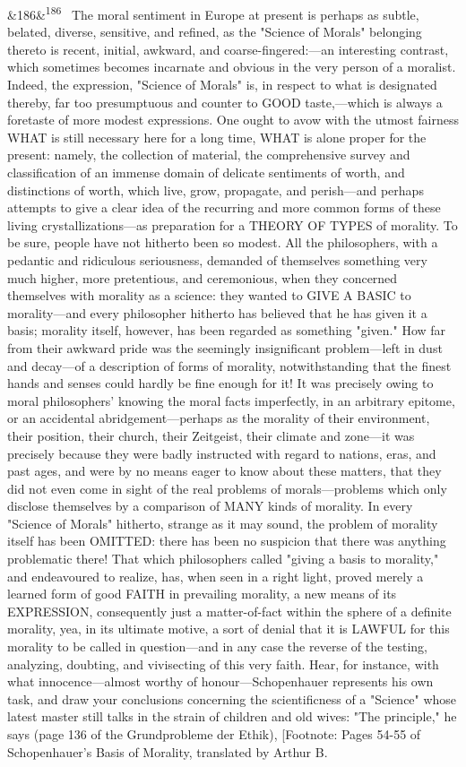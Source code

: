 \documentclass[12pt]{article}
\newcommand{\para}[1][]{\par\noindent\ifx&#1&\else\textsuperscript{\footnotesize #1}~\fi}
\begin{document}
\para[186] The moral sentiment in Europe at present is perhaps as subtle, belated, diverse, sensitive, and refined, as the "Science of Morals" belonging thereto is recent, initial, awkward, and coarse-fingered:---an interesting contrast, which sometimes becomes incarnate and obvious in the very person of a moralist. Indeed, the expression, "Science of Morals" is, in respect to what is designated thereby, far too presumptuous and counter to GOOD taste,---which is always a foretaste of more modest expressions. One ought to avow with the utmost fairness WHAT is still necessary here for a long time, WHAT is alone proper for the present: namely, the collection of material, the comprehensive survey and classification of an immense domain of delicate sentiments of worth, and distinctions of worth, which live, grow, propagate, and perish---and perhaps attempts to give a clear idea of the recurring and more common forms of these living crystallizations---as preparation for a THEORY OF TYPES of morality. To be sure, people have not hitherto been so modest. All the philosophers, with a pedantic and ridiculous seriousness, demanded of themselves something very much higher, more pretentious, and ceremonious, when they concerned themselves with morality as a science: they wanted to GIVE A BASIC to morality---and every philosopher hitherto has believed that he has given it a basis; morality itself, however, has been regarded as something "given." How far from their awkward pride was the seemingly insignificant problem---left in dust and decay---of a description of forms of morality, notwithstanding that the finest hands and senses could hardly be fine enough for it! It was precisely owing to moral philosophers' knowing the moral facts imperfectly, in an arbitrary epitome, or an accidental abridgement---perhaps as the morality of their environment, their position, their church, their Zeitgeist, their climate and zone---it was precisely because they were badly instructed with regard to nations, eras, and past ages, and were by no means eager to know about these matters, that they did not even come in sight of the real problems of morals---problems which only disclose themselves by a comparison of MANY kinds of morality. In every "Science of Morals" hitherto, strange as it may sound, the problem of morality itself has been OMITTED: there has been no suspicion that there was anything problematic there! That which philosophers called "giving a basis to morality," and endeavoured to realize, has, when seen in a right light, proved merely a learned form of good FAITH in prevailing morality, a new means of its EXPRESSION, consequently just a matter-of-fact within the sphere of a definite morality, yea, in its ultimate motive, a sort of denial that it is LAWFUL for this morality to be called in question---and in any case the reverse of the testing, analyzing, doubting, and vivisecting of this very faith. Hear, for instance, with what innocence---almost worthy of honour---Schopenhauer represents his own task, and draw your conclusions concerning the scientificness of a "Science" whose latest master still talks in the strain of children and old wives: "The principle," he says (page 136 of the Grundprobleme der Ethik), [Footnote: Pages 54-55 of Schopenhauer's Basis of Morality, translated by Arthur B. 
\end{document}
